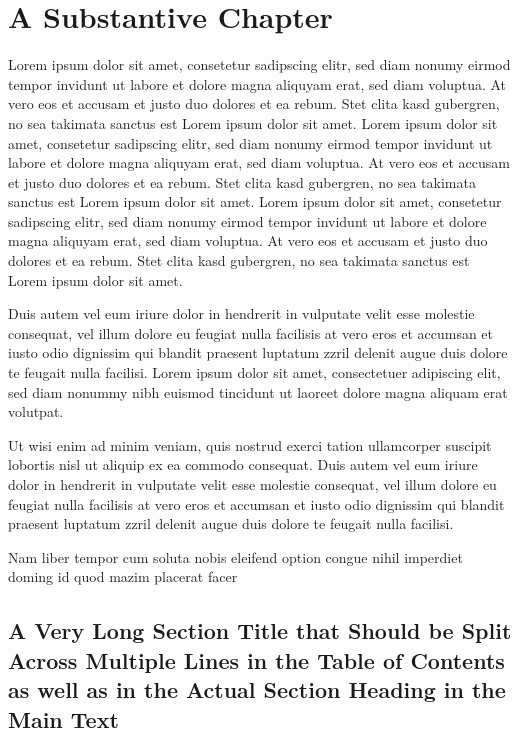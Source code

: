 
\chapter{A Substantive Chapter}

Lorem ipsum dolor sit amet, consetetur sadipscing elitr, sed diam nonumy eirmod tempor invidunt ut labore et dolore magna aliquyam erat, sed diam voluptua. At vero eos et accusam et justo duo dolores et ea rebum. Stet clita kasd gubergren, no sea takimata sanctus est Lorem ipsum dolor sit amet. Lorem ipsum dolor sit amet, consetetur sadipscing elitr, sed diam nonumy eirmod tempor invidunt ut labore et dolore magna aliquyam erat, sed diam voluptua. At vero eos et accusam et justo duo dolores et ea rebum. Stet clita kasd gubergren, no sea takimata sanctus est Lorem ipsum dolor sit amet. Lorem ipsum dolor sit amet, consetetur sadipscing elitr, sed diam nonumy eirmod tempor invidunt ut labore et dolore magna aliquyam erat, sed diam voluptua. At vero eos et accusam et justo duo dolores et ea rebum. Stet clita kasd gubergren, no sea takimata sanctus est Lorem ipsum dolor sit amet.   

Duis autem vel eum iriure dolor in hendrerit in vulputate velit esse molestie consequat, vel illum dolore eu feugiat nulla facilisis at vero eros et accumsan et iusto odio dignissim qui blandit praesent luptatum zzril delenit augue duis dolore te feugait nulla facilisi. Lorem ipsum dolor sit amet, consectetuer adipiscing elit, sed diam nonummy nibh euismod tincidunt ut laoreet dolore magna aliquam erat volutpat.   

Ut wisi enim ad minim veniam, quis nostrud exerci tation ullamcorper suscipit lobortis nisl ut aliquip ex ea commodo consequat. Duis autem vel eum iriure dolor in hendrerit in vulputate velit esse molestie consequat, vel illum dolore eu feugiat nulla facilisis at vero eros et accumsan et iusto odio dignissim qui blandit praesent luptatum zzril delenit augue duis dolore te feugait nulla facilisi.   

Nam liber tempor cum soluta nobis eleifend option congue nihil imperdiet doming id quod mazim placerat facer

\section{A Very Long Section Title that Should be Split Across Multiple Lines in the Table of Contents as well as in the Actual Section Heading in the Main Text}


